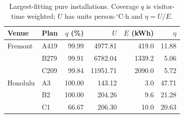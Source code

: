 \begin{table}[!ht]
\centering\small
\caption{Largest-fitting pure installations. Coverage $q$ is visitor-time weighted; $U$ has units person$\cdot{}^\circ$C$\cdot$h and $\eta=U/E$.}
\label{tab:venue-results}
\begin{tabular}{@{}llrrrr@{}}
\toprule
Venue & Plan & $q$ (\%) & $U$ & $E$ (kWh) & $\eta$\\
\midrule
Fremont & A419 & 99.99 & 4977.81 & 419.0 & 11.88\\
 & B279 & 99.91 & 6782.04 & 1339.2 & 5.06\\
 & C209 & 99.84 & 11951.71 & 2090.0 & 5.72\\
Honolulu & A3 & 100.00 & 143.12 & 3.0 & 47.71\\
 & B2 & 100.00 & 204.26 & 9.6 & 21.28\\
 & C1 & 66.67 & 206.30 & 10.0 & 20.63\\
\bottomrule
\end{tabular}
\end{table}

